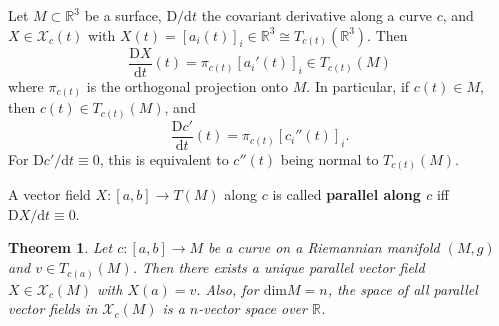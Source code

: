 \documentclass[letter-paper]{tufte-book}
\newtheorem{theorem}{\color{pastel-blue}Theorem}[section]
\newenvironment{example}[1][Example]{\begin{trivlist}
\item[\hskip \labelsep {\bfseries #1}]}{\end{trivlist}}
\begin{document}
\begin{example}
  Let $M\subset \mathbb{R}^3$ be a surface, $\mathrm{D}/\mathrm{d}t$ the covariant derivative along a curve $c$, and $X\in \mathcal{X}_c(t)$ with $X(t) = [a_i(t)]_i \in \mathbb{R}^3 \cong T_{c(t)}(\mathbb{R}^3)$. Then
  \begin{equation*}
    \frac{\mathrm{D}X}{\mathrm{d}t}(t) = \pi_{c(t)}[a_i'(t)]_i \in T_{c(t)}(M)
  \end{equation*}
  where $\pi_{c(t)}$ is the orthogonal projection onto $M$. In particular, if $c(t) \in M$, then $c(t) \in T_{c(t)}(M)$, and
  \begin{equation*}
    \frac{\mathrm{D}c'}{\mathrm{d}t}(t) = \pi_{c(t)}[c_i''(t)]_i.
  \end{equation*}
  For $\mathrm{D}c' / \mathrm{d}t \equiv 0$, this is equivalent to $c''(t)$ being normal to $T_{c(t)}(M)$.
\end{example}

A vector field $X:[a,b] \to T(M)$ along $c$ is called \textbf{parallel along $c$} iff $\mathrm{D}X / \mathrm{d}t \equiv 0$.

\begin{theorem}
  Let $c:[a,b] \to M$ be a curve on a Riemannian manifold $(M,g)$ and $v\in T_{c(a)}(M)$. Then there exists a unique parallel vector field $X \in \mathcal{X}_c(M)$ with $X(a) = v$. Also, for $\mbox{dim}M = n$, the space of all parallel vector fields in $\mathcal{X}_c(M)$ is a $n$-vector space over $\mathbb{R}$.
\end{theorem}
\end{document}
